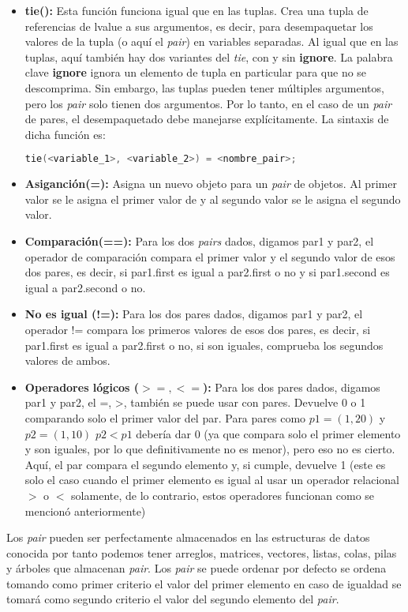 \begin{itemize}
	\item \textbf{tie():} Esta función funciona igual que en las tuplas. Crea una tupla de referencias de lvalue a sus argumentos, es decir, para desempaquetar los valores de la tupla (o aquí el \emph{pair}) en variables separadas. Al igual que en las tuplas, aquí también hay dos variantes del \emph{tie}, con y sin \textbf{ignore}. La palabra clave \textbf{ignore} ignora un elemento de tupla en particular para que no se descomprima.
	Sin embargo, las tuplas pueden tener múltiples argumentos, pero los \emph{pair} solo tienen dos argumentos. Por lo tanto, en el caso de un \emph{pair} de pares, el desempaquetado debe manejarse explícitamente. La sintaxis de dicha función es:
	\begin{lstlisting}[language=C++]
tie(<variable_1>, <variable_2>) = <nombre_pair>;
	\end{lstlisting}
	\item \textbf{Asiganción(=):} Asigna un nuevo objeto para un \emph{pair} de objetos. Al primer valor se le asigna el primer valor de y al segundo valor se le asigna el segundo valor.
	\item \textbf{Comparación(==):} Para los dos \emph{pairs} dados, digamos par1 y par2, el operador de comparación compara el primer valor y el segundo valor de esos dos pares, es decir, si par1.first es igual a par2.first o no y si par1.second es igual a par2.second o no.
	\item \textbf{No es igual (!=):} Para los dos pares dados, digamos par1 y par2, el operador != compara los primeros valores de esos dos pares, es decir, si par1.first es igual a par2.first o no, si son iguales, comprueba los segundos valores de ambos.
	\item \textbf{Operadores lógicos ($>=,<=$):} Para los dos pares dados, digamos par1 y par2, el =, >, también se puede usar con pares. Devuelve 0 o 1 comparando solo el primer valor del par. Para pares como $p1=(1,20)$ y $p2=(1,10)$ $p2<p1$ debería dar 0 (ya que compara solo el primer elemento y son iguales, por lo que definitivamente no es menor), pero eso no es cierto. Aquí, el par compara el segundo elemento y, si cumple, devuelve 1 (este es solo el caso cuando el primer elemento es igual al usar un operador relacional $>$ o $<$ solamente, de lo contrario, estos operadores funcionan como se mencionó anteriormente)
\end{itemize}

Los \emph{pair} pueden ser perfectamente almacenados en las estructuras de datos conocida por tanto podemos tener arreglos, matrices, vectores, listas, colas, pilas y árboles que almacenan \emph{pair}. Los \emph{pair} se puede ordenar por defecto se ordena tomando como primer criterio el valor del primer elemento en caso de igualdad se tomará como segundo criterio el valor del segundo elemento del \emph{pair}.

